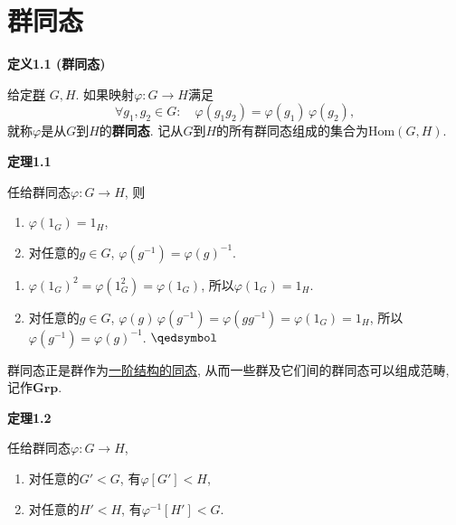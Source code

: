 \documentclass[UTF8]{ctexart}
\begin{document}
\setlength{\abovedisplayskip}{1pt}
\setlength{\belowdisplayskip}{1pt}

\section{群同态}

\hypertarget{sec:定义1.1}{}
\noindent\textbf{定义1.1 (群同态)}

给定\href{01 半群与群#nameddest=sec:定义2.1}{群} $G,H$. 如果映射$\varphi:G\to H$满足
\[
    \forall g_1,g_2\in G:\quad\varphi(g_1g_2)=\varphi(g_1)\,\varphi(g_2),
\]
就称$\varphi$是从$G$到$H$的\textbf{群同态}.
记从$G$到$H$的所有群同态组成的集合为$\mathrm{Hom}(G,H)$.

\vspace{10pt}

\hypertarget{sec:定理1.1}{}
\noindent\textbf{定理1.1}

任给群同态$\varphi:G\to H$, 则
\begin{enumerate}
    \item $\varphi(1_G)=1_H$,
    \item 对任意的$g\in G$, $\varphi(g^{-1})=\varphi(g)^{-1}$.
\end{enumerate}


\begin{enumerate}
    \item $\varphi(1_G)^2=\varphi(1_G^2)=\varphi(1_G)$, 所以$\varphi(1_G)=1_H$.
    \item 对任意的$g\in G$, $\varphi(g)\,\varphi(g^{-1})=\varphi(gg^{-1})
    =\varphi(1_G)=1_H$, 所以$\varphi(g^{-1})=\varphi(g)^{-1}$. \hfill $\qedsymbol$
\end{enumerate}

\vspace{10pt}

群同态正是群作为\href{../../../06 数理逻辑/02 模型论/01 一阶语言的结构/02 结构的同态#nameddest=sec:定义1.1}
{一阶结构的同态}, 从而一些群及它们间的群同态可以组成范畴, 记作$\mathbf{Grp}$.

\vspace{10pt}

\hypertarget{sec:定理1.2}{}
\noindent\textbf{定理1.2}

任给群同态$\varphi:G\to H$,
\begin{enumerate}
    \item 对任意的$G'<G$, 有$\varphi[G']<H$,
    \item 对任意的$H'<H$, 有$\varphi^{-1}[H']<G$.
\end{enumerate}
\end{document}
